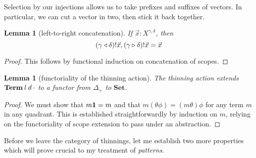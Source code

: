 \documentclass{jfp1}
\newtheorem{lemma}[theorem]{Lemma}
\newcommand{\Set}{\textbf{Set}}
\begin{document}
Selection by our injections allows us to take prefixes and suffixes of
vectors. In particular, we can cut a vector in two, then stick it back
together.

\begin{lemma}[left-to-right concatenation]
  If $\vec x : X^{\gamma,\delta}$, then
  \[
    (\gamma \triangleleft \delta)!\vec x, (\gamma \triangleright \delta)!\vec x
    = \vec x
  \]
\end{lemma}
\begin{proof}
  This follows by functional induction on concatenation of scopes.
\end{proof}


\begin{lemma}[functoriality of the thinning action]
 The thinning action extends $\mathbf{Term}\:l\:d\:\cdot$ to a functor from $\Delta_+$ to $\Set$.
\end{lemma}
\begin{proof}
  We must show that $m\mathbf{1} = m$ and that $m(\theta\phi) = (m\theta)\phi$ for any term $m$ in any quadrant.
  This is established straightforwardly by induction on $m$, relying on the functoriality of scope extension
  to pass under an abstraction.
\end{proof}

Before we leave the category of thinnings, let me establish two more properties which
will prove crucial to my treatment of \emph{patterns}.
\end{document}
